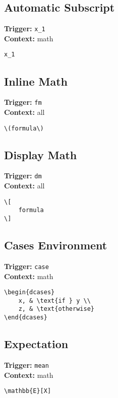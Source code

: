 \documentclass{article}
\begin{document}
\subsection{Automatic Subscript}
\textbf{Trigger:} \texttt{x\_1} \\
\textbf{Context:} math \\
\begin{lstlisting}
x_1
\end{lstlisting}

\subsection{Inline Math}
\textbf{Trigger:} \texttt{fm} \\
\textbf{Context:} all \\
\begin{lstlisting}
\(formula\)
\end{lstlisting}

\subsection{Display Math}
\textbf{Trigger:} \texttt{dm} \\
\textbf{Context:} all \\
\begin{lstlisting}
\[
    formula
\]
\end{lstlisting}

\subsection{Cases Environment}
\textbf{Trigger:} \texttt{case} \\
\textbf{Context:} math \\
\begin{lstlisting}
\begin{dcases}
    x, & \text{if } y \\
    z, & \text{otherwise}
\end{dcases}
\end{lstlisting}

\subsection{Expectation}
\textbf{Trigger:} \texttt{mean} \\
\textbf{Context:} math \\
\begin{lstlisting}
\mathbb{E}[X]
\end{lstlisting}
\end{document}
